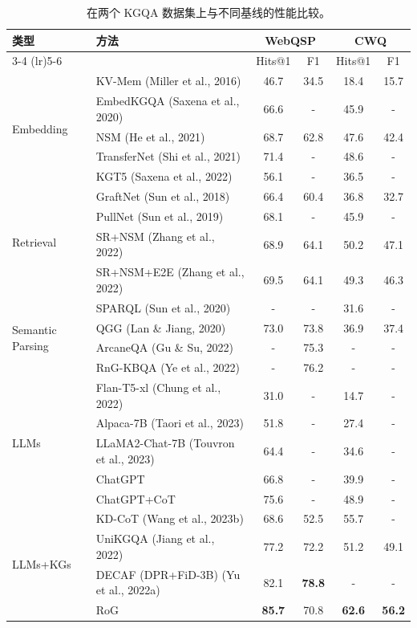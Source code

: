 \documentclass[11pt,UTF8,fontset=fandol]{ctexart}
\begin{document}
\begin{table}[H]
\centering
\caption{在两个 KGQA 数据集上与不同基线的性能比较。}
\label{tab:1}
\begin{tabular}{llcccc}
\toprule
\multirow{2}{*}{类型} & \multirow{2}{*}{方法} & \multicolumn{2}{c}{WebQSP} & \multicolumn{2}{c}{CWQ} \\
\cmidrule(lr){3-4} \cmidrule(lr){5-6}
 & & Hits@1 & F1 & Hits@1 & F1 \\
\midrule
\multirow{5}{*}{Embedding}
 & KV-Mem (Miller et al., 2016)        & 46.7 & 34.5 & 18.4 & 15.7 \\
 & EmbedKGQA (Saxena et al., 2020)     & 66.6 & -    & 45.9 & -    \\
 & NSM (He et al., 2021)               & 68.7 & 62.8 & 47.6 & 42.4 \\
 & TransferNet (Shi et al., 2021)      & 71.4 & -    & 48.6 & -    \\
 & KGT5 (Saxena et al., 2022)          & 56.1 & -    & 36.5 & -    \\
\midrule
\multirow{4}{*}{Retrieval}
 & GraftNet (Sun et al., 2018)         & 66.4 & 60.4 & 36.8 & 32.7 \\
 & PullNet (Sun et al., 2019)          & 68.1 & -    & 45.9 & -    \\
 & SR+NSM (Zhang et al., 2022)         & 68.9 & 64.1 & 50.2 & 47.1 \\
 & SR+NSM+E2E (Zhang et al., 2022)     & 69.5 & 64.1 & 49.3 & 46.3 \\
\midrule
\multirow{4}{*}{Semantic Parsing}
 & SPARQL (Sun et al., 2020)           & -    & -    & 31.6 & -    \\
 & QGG (Lan \& Jiang, 2020)            & 73.0 & 73.8 & 36.9 & 37.4 \\
 & ArcaneQA (Gu \& Su, 2022)           & -    & 75.3 & -    & -    \\
 & RnG-KBQA (Ye et al., 2022)          & -    & 76.2 & -    & -    \\
\midrule
\multirow{5}{*}{LLMs}
 & Flan-T5-xl (Chung et al., 2022)        & 31.0 & - & 14.7 & - \\
 & Alpaca-7B (Taori et al., 2023)         & 51.8 & - & 27.4 & - \\
 & LLaMA2-Chat-7B (Touvron et al., 2023)  & 64.4 & - & 34.6 & - \\
 & ChatGPT                                & 66.8 & - & 39.9 & - \\
 & ChatGPT+CoT                            & 75.6 & - & 48.9 & - \\
\midrule
\multirow{4}{*}{LLMs+KGs}
 & KD-CoT (Wang et al., 2023b)            & 68.6 & 52.5 & 55.7 & - \\
 & UniKGQA (Jiang et al., 2022)           & 77.2 & 72.2 & 51.2 & 49.1 \\
 & DECAF (DPR+FiD-3B) (Yu et al., 2022a)  & 82.1 & \textbf{78.8} & - & - \\
 & RoG                                    & \textbf{85.7} & 70.8 & \textbf{62.6} & \textbf{56.2} \\
\bottomrule
\end{tabular}
\end{table}
\end{document}

